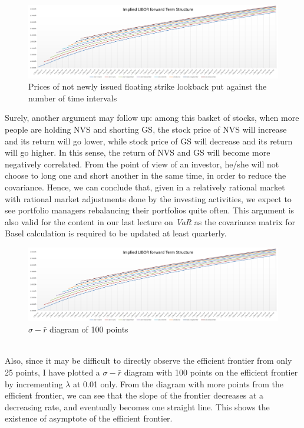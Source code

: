 \begin{figure}[h]
	\centering
	\includegraphics[scale=0.4]{biu.PNG}
	\caption{Prices of not newly issued floating strike lookback put against the number of time intervals}
\end{figure}
Surely, another argument may follow up: among this basket of stocks, when more people are holding NVS and shorting GS, the stock price of NVS will increase and its return will go lower, while stock price of GS will decrease and its return will go higher. In this sense, the return of NVS and GS will become more negatively correlated. From the point of view of an investor, he/she will not choose to long one and short another in the same time, in order to reduce the covariance. Hence, we can conclude that, given in a relatively rational market with rational market adjustments done by the investing activities, we expect to see portfolio managers rebalancing their portfolios quite often. This argument is also valid for the content in our last lecture on \emph{VaR} as the covariance matrix for Basel calculation is required to be updated at least quarterly.
\begin{figure}[h]
	\centering
	\includegraphics[scale=0.5]{biu.PNG}
	\caption{$\sigma-\bar{r}$ diagram of 100 points}
\end{figure}
\\[4mm]Also, since it may be difficult to directly observe the efficient frontier from only 25 points, I have plotted a $\sigma-\bar{r}$ diagram with 100 points on the efficient frontier by incrementing $\lambda$ at 0.01 only. From the diagram with more points from the efficient frontier, we can see that the slope of the frontier decreases at a decreasing rate, and eventually becomes one straight line. This shows the existence of asymptote of the efficient frontier.
